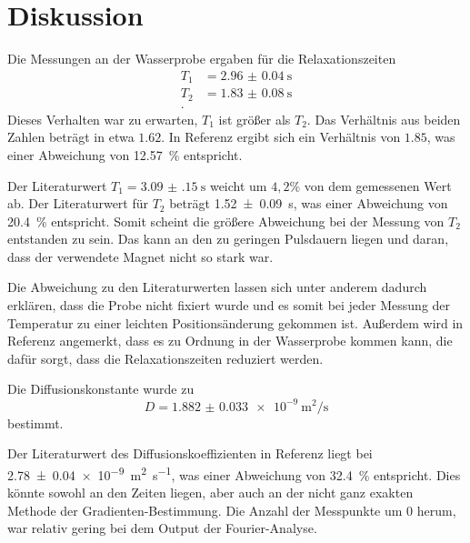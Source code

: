 \section{Diskussion}

Die Messungen an der Wasserprobe ergaben für die Relaxationszeiten
\begin{align*}
    T_1 &= \SI{2.96(4)}{\second} \\
    T_2 &= \SI{1.83(8)}{\second} \\.
\end{align*}
Dieses Verhalten war zu erwarten, $T_1$ ist größer als $T_2$. 
Das Verhältnis aus beiden Zahlen beträgt in etwa $\num{1.62}$. 
In Referenz \cite{chang} ergibt sich ein Verhältnis von $\num{1.85}$, was einer Abweichung von \SI{12.57}{\percent} entspricht. 

Der Literaturwert $T_1=\SI{3.09(15)}{\second}$ weicht um $4,2\%$ von dem gemessenen Wert ab.
Der Literaturwert für $T_2$ beträgt \SI{1.52(9)}{\second}, was einer Abweichung von \SI{20.4}{\percent} entspricht. 
Somit scheint die größere Abweichung bei der Messung von $T_2$ entstanden zu sein. Das kann an den zu geringen Pulsdauern liegen und daran, dass der verwendete Magnet nicht so stark war.

Die Abweichung zu den Literaturwerten lassen sich unter anderem dadurch erklären, dass die Probe nicht fixiert wurde und es somit bei jeder Messung der Temperatur zu einer leichten Positionsänderung gekommen ist.
Außerdem wird in Referenz \cite{chang} angemerkt, dass es zu Ordnung in der Wasserprobe kommen kann, die dafür sorgt, dass die Relaxationszeiten reduziert werden. 

Die Diffusionskonstante wurde zu 
\begin{equation*}
    D = \SI{1.882(33)e-9}{\meter\squared\per\second}
    \end{equation*}
bestimmt. 

Der Literaturwert des Diffusionskoeffizienten in Referenz \cite{chang} liegt bei \SI{2.78(4)e-9}{\meter\squared\per\second}, was einer Abweichung von \SI{32.4}{\percent} entspricht. Dies könnte sowohl an den Zeiten liegen, aber auch an der nicht ganz exakten Methode der Gradienten-Bestimmung. Die Anzahl der Messpunkte um \num{0} herum, war relativ gering bei dem Output der Fourier-Analyse. 




